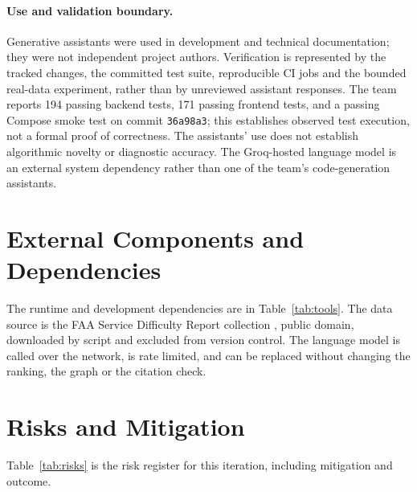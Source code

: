 \paragraph{Use and validation boundary.}
Generative assistants were used in development and technical documentation; they were not independent project authors. Verification is represented by the tracked changes, the committed test suite, reproducible CI jobs and the bounded real-data experiment, rather than by unreviewed assistant responses. The team reports 194 passing backend tests, 171 passing frontend tests, and a passing Compose smoke test on commit \texttt{36a98a3}; this establishes observed test execution, not a formal proof of correctness. The assistants' use does not establish algorithmic novelty or diagnostic accuracy. The Groq-hosted language model is an external system dependency rather than one of the team's code-generation assistants.

\section{External Components and Dependencies}

The runtime and development dependencies are in Table~\ref{tab:tools}. The data source is the FAA Service Difficulty Report collection \citep{faa2025}, public domain, downloaded by script and excluded from version control. The language model is called over the network, is rate limited, and can be replaced without changing the ranking, the graph or the citation check.

\section{Risks and Mitigation}

Table~\ref{tab:risks} is the risk register for this iteration, including mitigation and outcome.

